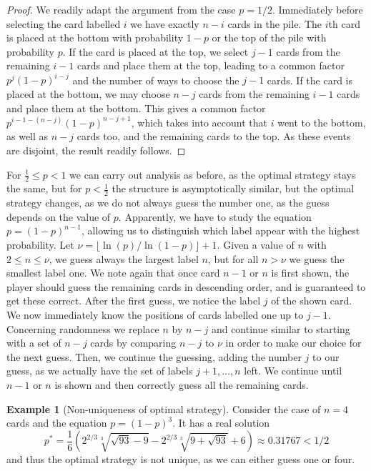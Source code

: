 \documentclass[10pt,reqno,a4paper]{amsart}
\theoremstyle{definition}
\newtheorem{example}{Example}
\begin{document}
\begin{proof}
We readily adapt the argument from the case $p=1/2$. Immediately before selecting the card labelled $i$ we have exactly $n-i$ cards in the pile. The $i$th card is placed at the bottom with probability $1-p$
or the top of the pile with probability $p$. If the card is placed at the top, we select $j-1$ cards from the remaining $i-1$ cards
and place them at the top, leading to a common factor $p^{j}(1-p)^{i-j}$ and the number of ways to choose the $j-1$ cards. If the card is placed at the bottom, we may choose $n-j$ cards from the remaining $i - 1$ cards and place them at the bottom. This gives a common factor $p^{i-1-(n-j)}(1-p)^{n-j+1}$, which takes into account that $i$ went to the bottom, as well as $n-j$ cards too, and the remaining cards to the top. As these events are disjoint, the result readily follows.
\end{proof}


For $\frac12\le p<1$ we can carry out analysis as before, as the optimal strategy stays the same, but for $p<\frac12$ the structure is asymptotically similar, but the optimal strategy changes, 
as we do not always guess the number one, as the guess depends on the value of $p$. 
Apparently, we have to study the equation $p=(1-p)^{n-1}$, allowing us to distinguish which label appear with the highest probability. Let $\nu=\lfloor \ln(p)/\ln(1-p)\rfloor+1$. Given a value of $n$ with $2\le n\le \nu$, we guess always the largest label $n$, but for all $n>\nu$ we guess the smallest label one. We note again that once card $n-1$ or $n$ is first shown, the player should guess the remaining cards in descending order, and is guaranteed to get these correct. After the first guess, we notice the label $j$ of the shown card. We now immediately know the positions of cards labelled one up to $j-1$. Concerning randomness we replace $n$ by $n-j$ and continue similar to starting with a set of $n-j$ cards by comparing $n-j$ to $\nu$ in order to make our choice for the next guess. Then, we continue the guessing, adding the number $j$ to our guess, as we actually
have the set of labels $j+1,\dots, n$ left. We continue until $n-1$ or $n$ is shown and then correctly guess all the remaining cards.

\begin{example}[Non-uniqueness of optimal strategy]
Consider the case of $n=4$ cards and the equation $p=(1-p)^3$. It has a real solution 
\[
p^{\ast}=
\frac{1}{6}\left(
2^{2/3} \sqrt[3]{\sqrt{93}-9}
- 2^{2/3} \sqrt[3]{9+\sqrt{93}}
+ 6
\right)\approx 0.31767<1/2
\]
and thus the optimal strategy is not unique, as we can either guess one or four. 
\end{example}
\end{document}
